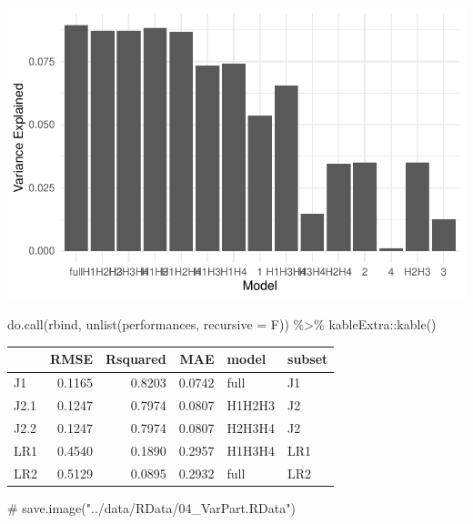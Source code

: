 \documentclass[
  letterpaper,
  DIV=11,
  numbers=noendperiod]{scrreprt}
\newenvironment{Shaded}{\begin{snugshade}}{\end{snugshade}}
\newcommand{\AttributeTok}[1]{\textcolor[rgb]{0.40,0.45,0.13}{#1}}
\newcommand{\CommentTok}[1]{\textcolor[rgb]{0.37,0.37,0.37}{#1}}
\newcommand{\FunctionTok}[1]{\textcolor[rgb]{0.28,0.35,0.67}{#1}}
\newcommand{\NormalTok}[1]{\textcolor[rgb]{0.00,0.23,0.31}{#1}}
\newcommand{\SpecialCharTok}[1]{\textcolor[rgb]{0.37,0.37,0.37}{#1}}
\begin{document}
\includegraphics{05_VarPart_files/figure-pdf/var-part-ranger-performance-eval-LR2-1.pdf}

\begin{Shaded}
\begin{Highlighting}[]
\FunctionTok{do.call}\NormalTok{(rbind, }\FunctionTok{unlist}\NormalTok{(performances, }\AttributeTok{recursive =}\NormalTok{ F)) }\SpecialCharTok{\%\textgreater{}\%}\NormalTok{ kableExtra}\SpecialCharTok{::}\FunctionTok{kable}\NormalTok{()}
\end{Highlighting}
\end{Shaded}

\begin{longtable}[]{@{}lrrrll@{}}
\toprule\noalign{}
& RMSE & Rsquared & MAE & model & subset \\
\midrule\noalign{}
\endhead
\bottomrule\noalign{}
\endlastfoot
J1 & 0.1165 & 0.8203 & 0.0742 & full & J1 \\
J2.1 & 0.1247 & 0.7974 & 0.0807 & H1H2H3 & J2 \\
J2.2 & 0.1247 & 0.7974 & 0.0807 & H2H3H4 & J2 \\
LR1 & 0.4540 & 0.1890 & 0.2957 & H1H3H4 & LR1 \\
LR2 & 0.5129 & 0.0895 & 0.2932 & full & LR2 \\
\end{longtable}

\begin{Shaded}
\begin{Highlighting}[]
\CommentTok{\# save.image("../data/RData/04\_VarPart.RData")}
\end{Highlighting}
\end{Shaded}

\end{document}
